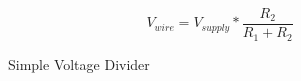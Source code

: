 \documentclass[a4]{report}
\begin{document}
	\begin{equation}
		V_{wire} = V_{supply} * \frac{R_2}{R_1+ R_2}
		\label{eqnvdiv}
	\end{equation}
	
	\begin{figure}[!htb]
		\centering
		\caption{Simple Voltage Divider}
		\label{figvdiv}
	\end{figure}
\end{document}
